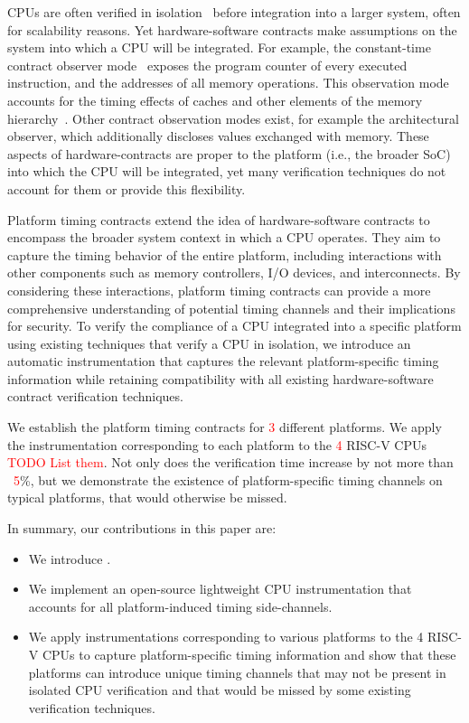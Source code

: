 CPUs are often verified in isolation~\cite{dinesh2024conjunct,dinesh2025h,ceesay2024mucfi,wang2023specification,tan2025contractshadowlogic,hsiao2024rtl2mmupath} before integration into a larger system, often for scalability reasons.
Yet hardware-software contracts make assumptions on the system into which a CPU will be integrated.
For example, the constant-time contract observer mode~\cite{guarnieri2021hardware} exposes the program counter of every executed instruction, and the addresses of all memory operations.
This observation mode accounts for the timing effects of caches and other elements of the memory hierarchy~\cite{guarnieri2021hardware,oleksenko2022revizor}.
Other contract observation modes exist, for example the architectural observer, which additionally discloses values exchanged with memory.
These aspects of hardware-contracts are proper to the platform (i.e., the broader SoC) into which the CPU will be integrated, yet many verification techniques do not account for them or provide this flexibility.

Platform timing contracts extend the idea of hardware-software contracts to encompass the broader system context in which a CPU operates.
They aim to capture the timing behavior of the entire platform, including interactions with other components such as memory controllers, I/O devices, and interconnects.
By considering these interactions, platform timing contracts can provide a more comprehensive understanding of potential timing channels and their implications for security.
To verify the compliance of a CPU integrated into a specific platform using existing techniques that verify a CPU in isolation, we introduce an automatic instrumentation that captures the relevant platform-specific timing information while retaining compatibility with all existing hardware-software contract verification techniques.

We establish the platform timing contracts for \textcolor{red}{3} different platforms.
We apply the instrumentation corresponding to each platform to the \textcolor{red}{4} RISC-V CPUs \textcolor{red}{TODO List them}.
Not only does the verification time increase by not more than ~\textcolor{red}{5}\%, but we demonstrate the existence of platform-specific timing channels on typical platforms, that would otherwise be missed.

In summary, our contributions in this paper are:
\begin{itemize}
    \item We introduce \pics.
    \item We implement an open-source lightweight CPU instrumentation that accounts for all platform-induced timing side-channels.
    \item We apply instrumentations corresponding to various platforms to the 4 RISC-V CPUs to capture platform-specific timing information and show that these platforms can introduce unique timing channels that may not be present in isolated CPU verification and that would be missed by some existing verification techniques.
\end{itemize}

